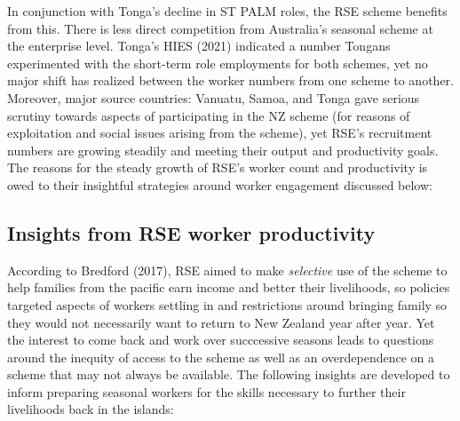 \documentclass[9pt,a4paper,twocolumn,twoside]{tau-class/tau}
\begin{document}
        In conjunction with Tonga's decline in ST PALM roles, the RSE scheme benefits from this. There is less direct competition from Australia's seasonal scheme at the enterprise level. Tonga's HIES (2021) indicated a number Tongans experimented with the short-term role employments for both schemes, yet no major shift has realized between the worker numbers from one scheme to another. Moreover, major source countries: Vanuatu, Samoa, and Tonga gave serious scrutiny towards aspects of participating in the NZ scheme (for reasons of exploitation and social issues arising from the scheme), yet RSE's recruitment numbers are growing steadily and meeting their output and productivity goals. The reasons for the steady growth of RSE's worker count and productivity is owed to their insightful strategies around worker engagement discussed below: \\


\subsection{Insights from RSE worker productivity}




        According to Bredford (2017), RSE aimed to make \textit{selective} use of the scheme to help families from the pacific earn income and better their livelihoods, so policies targeted aspects of workers settling in and restrictions around bringing family so they would not necessarily want to return to New Zealand year after year. Yet the interest to come back and work over succcessive seasons leads to questions around the inequity of access to the scheme as well as an overdependence on a scheme that may not always be available. The following insights are developed to inform preparing seasonal workers for the skills necessary to further their livelihoods back in the islands:
\end{document}
